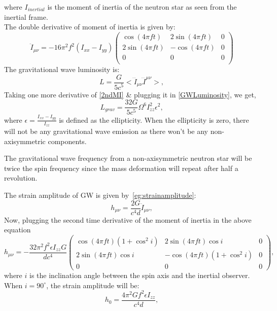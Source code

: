 \documentclass{ttuthes2007}
\begin{document}
where $I_{inertial}$ is the moment of inertia of the neutron star as seen from
the inertial frame.\\
The double derivative of moment of inertia is given by:
\begin{equation} \label{2ndMI}
\ddot{I}_{\mu\nu}=-16\pi ^2f^2(I_{xx}-I_{yy})
\begin{pmatrix}
\cos{(4\pi f t)} & 2\sin{(4\pi f t)} & 0 \\
2\sin{(4\pi f t)} & -\cos{(4\pi f t)} & 0 \\
0 & 0 & 0 \\
\end{pmatrix}
\end{equation}
The gravitational wave luminosity is:
\begin{equation}\label{GWLuminosity}
L= \frac{G}{5c^5}<\dddot{I}_{\mu\nu}\dddot{I}^{\mu\nu}>,
\end{equation}
Taking one more derivative of \ref{2ndMI} \& plugging it in \ref{GWLuminosity}, we get,
\begin{equation}\label{Lgw}
L_{grav}= \frac{32G}{5c^5}\Omega ^6 I_{zz}^2\epsilon ^2,
\end{equation}
where $\epsilon =\frac{I_{xx}-I_{yy}}{I_{zz}}$ is defined as the ellipticity. When
the ellipticity is zero, there will not be any gravitational wave emission as there won't be any non-axisymmetric components.

The gravitational wave frequency from a non-axisymmetric neutron star will be
twice the spin frequency since the mass deformation will repeat after half a
revolution.

The strain amplitude of \ac{GW} is given by~\ref{eg:strainamplitude}:
\begin{equation}
h_{\mu\nu}=\frac{2G}{c^4d}\ddot{I}_{\mu\nu},
\end{equation}
Now, plugging the second time derivative of the moment of inertia in the above equation
\begin{equation} \label{3rdMI}
h_{\mu\nu}=-\frac{32\pi^2f^2 \epsilon I_{zz}G}{dc^4}
\begin{pmatrix}
\cos(4\pi f t)(1+\cos^2{i}) & 2\sin{(4\pi f t)}\cos{i} & 0 \\
2\sin{(4\pi f t)}\cos{i} & -\cos{(4\pi f t)}(1+\cos ^2i) & 0 \\
0 & 0 & 0 
\end{pmatrix},
\end{equation}
where $i$ is the inclination angle between the spin axis and
the inertial observer. When $i=90^\circ$, the strain amplitude will be:
\begin{equation}
h_0=\frac{4\pi ^2Gf^2 \epsilon I_{zz}}{c^4d},
\end{equation}
\end{document}

